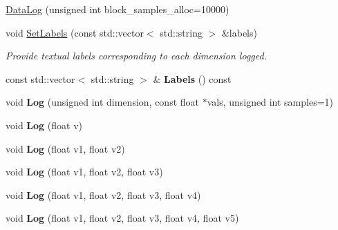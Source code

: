 \begin{DoxyCompactItemize}
\item 
\hyperlink{classpangolin_1_1_data_log_a0c8f4f1670198d8a3ea316871d6fb44a}{Data\+Log} (unsigned int block\+\_\+samples\+\_\+alloc=10000)
\item 
void \hyperlink{classpangolin_1_1_data_log_aa7eb0e27c58460dd5392158f9ead6d3b}{Set\+Labels} (const std\+::vector$<$ std\+::string $>$ \&labels)
\begin{DoxyCompactList}\small\item\em Provide textual labels corresponding to each dimension logged. \end{DoxyCompactList}\item 
const std\+::vector$<$ std\+::string $>$ \& {\bfseries Labels} () const \hypertarget{classpangolin_1_1_data_log_a7f82e7854a40fe48eca912a4fdc3fd3c}{}\label{classpangolin_1_1_data_log_a7f82e7854a40fe48eca912a4fdc3fd3c}

\item 
void {\bfseries Log} (unsigned int dimension, const float $\ast$vals, unsigned int samples=1)\hypertarget{classpangolin_1_1_data_log_a8e18b177f25638e0bc5bbbadd6869ac3}{}\label{classpangolin_1_1_data_log_a8e18b177f25638e0bc5bbbadd6869ac3}

\item 
void {\bfseries Log} (float v)\hypertarget{classpangolin_1_1_data_log_ac3514c098e2fd0831ccfca5800cf4de7}{}\label{classpangolin_1_1_data_log_ac3514c098e2fd0831ccfca5800cf4de7}

\item 
void {\bfseries Log} (float v1, float v2)\hypertarget{classpangolin_1_1_data_log_aba33eb426fe42c9eebe9db5df756eab2}{}\label{classpangolin_1_1_data_log_aba33eb426fe42c9eebe9db5df756eab2}

\item 
void {\bfseries Log} (float v1, float v2, float v3)\hypertarget{classpangolin_1_1_data_log_a239375ed52092dc34df73f9769bb8916}{}\label{classpangolin_1_1_data_log_a239375ed52092dc34df73f9769bb8916}

\item 
void {\bfseries Log} (float v1, float v2, float v3, float v4)\hypertarget{classpangolin_1_1_data_log_a8b5655beb52a0bfefcd5f1cad7740471}{}\label{classpangolin_1_1_data_log_a8b5655beb52a0bfefcd5f1cad7740471}

\item 
void {\bfseries Log} (float v1, float v2, float v3, float v4, float v5)\hypertarget{classpangolin_1_1_data_log_a3e5bb5245f7ace74d1edfe22cf3caca2}{}\label{classpangolin_1_1_data_log_a3e5bb5245f7ace74d1edfe22cf3caca2}


\end{DoxyCompactItemize}

